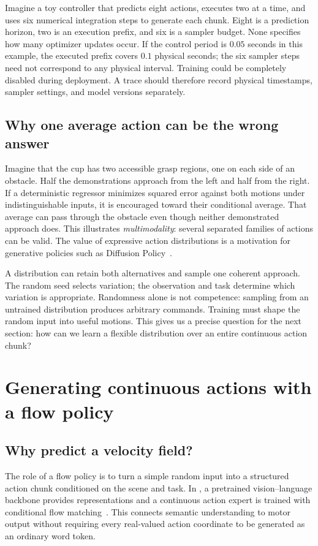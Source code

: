 Imagine a toy controller that predicts eight actions, executes two at a time, and uses six numerical integration steps to generate each chunk. Eight is a prediction horizon, two is an execution prefix, and six is a sampler budget. None specifies how many optimizer updates occur. If the control period is $0.05$ seconds in this example, the executed prefix covers $0.1$ physical seconds; the six sampler steps need not correspond to any physical interval. Training could be completely disabled during deployment. A trace should therefore record physical timestamps, sampler settings, and model versions separately.

\subsection{Why one average action can be the wrong answer}
Imagine that the cup has two accessible grasp regions, one on each side of an obstacle. Half the demonstrations approach from the left and half from the right. If a deterministic regressor minimizes squared error against both motions under indistinguishable inputs, it is encouraged toward their conditional average. That average can pass through the obstacle even though neither demonstrated approach does. This illustrates \emph{multimodality}: several separated families of actions can be valid. The value of expressive action distributions is a motivation for generative policies such as Diffusion Policy~\citep{diffusionpolicy}.

A distribution can retain both alternatives and sample one coherent approach. The random seed selects variation; the observation and task determine which variation is appropriate. Randomness alone is not competence: sampling from an untrained distribution produces arbitrary commands. Training must shape the random input into useful motions. This gives us a precise question for the next section: how can we learn a flexible distribution over an entire continuous action chunk?

\section{Generating continuous actions with a flow policy}
\subsection{Why predict a velocity field?}
The role of a flow policy is to turn a simple random input into a structured action chunk conditioned on the scene and task. In \piz, a pretrained vision--language backbone provides representations and a continuous action expert is trained with conditional flow matching~\citep{pi0}. This connects semantic understanding to motor output without requiring every real-valued action coordinate to be generated as an ordinary word token.

